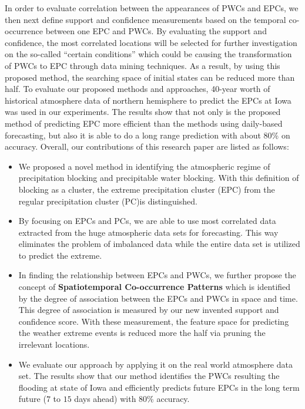 \documentclass{acm_proc_article-sp}
\begin{document}
\newline In order to evaluate correlation between the appearances of PWCs and
EPCs, we then next define support and confidence measurements based on the
temporal co-occurrence between one EPC and PWCs. By evaluating the support and
confidence, the most correlated locations will be selected for further
investigation on the so-called ``certain conditions'' which could be causing the
transformation of PWCs to EPC through data mining techniques. As a result, by using this proposed method, the searching space of initial states can be reduced more than half.
\newline
To evaluate our proposed methods and approaches, 40-year worth of
historical atmosphere data of northern hemisphere to predict the EPCs at
Iowa was used in our experiments. The results show that not only is the proposed method
of predicting EPC more efficient than the methods using daily-based
forecasting, but also it is able to do a long range prediction with about 80\% on
accuracy.
\newline Overall, our contributions of this research paper are listed as
follows:
\begin{itemize}
\item We proposed a novel method in identifying the atmospheric regime of
precipitation blocking and precipitable water blocking. With this
definition of blocking as a cluster, the extreme precipitation cluster (EPC) from the regular precipitation cluster (PC)is distinguished. 
\item By focusing on EPCs and PCs, we are able to use most correlated data
extracted from the huge atmospheric data sets for forecasting. This way
eliminates the problem of imbalanced data while the entire data set is utilized to
predict the extreme.
\item In finding the relationship between EPCs and PWCs, we further propose
the concept of \textbf{Spatiotemporal Co-occurrence Patterns} which is
identified by the degree of association between the EPCs and PWCs in space and
time. This degree of association is measured by our new invented support and
confidence score. With these measurement, the feature
space for predicting the weather extreme events is reduced more the half via pruning the
irrelevant locations.
\item We evaluate our approach by applying it on the real world atmosphere data
set. The results show that our method identifies the PWCs resulting the
flooding at state of Iowa and efficiently predicts future EPCs in the long
term future ($7$ to $15$ days ahead) with 80\% accuracy.
\end{itemize}
\end{document}
